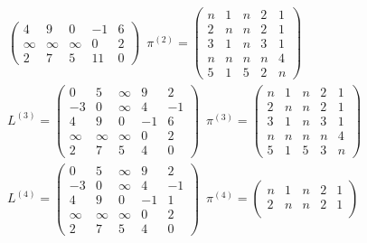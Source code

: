 \documentclass[11pt,a4paper]{article}
\begin{document}
\begin{loesung}
\begin{enumerate}
\begin{align*}
\begin{pmatrix}
                4 & 9 & 0 & -1 & 6 \\
                \infty & \infty & \infty & 0 & 2 \\
                2 & 7 & 5 & 11 & 0
            \end{pmatrix}\,\,\,
            \pi^{(2)} = \begin{pmatrix}
                n & 1 & n & 2 & 1 \\
                2 & n & n & 2 & 1 \\
                3 & 1 & n & 3 & 1 \\
                n & n & n & n & 4 \\
                5 & 1 & 5 & 2 & n
            \end{pmatrix} \\
            L^{(3)} = \begin{pmatrix}
                0 & 5 & \infty & 9 & 2 \\
                -3 & 0 & \infty & 4 & -1 \\
                4 & 9 & 0 & -1 & 6 \\
                \infty & \infty & \infty & 0 & 2 \\
                2 & 7 & 5 & 4 & 0
            \end{pmatrix}\,\,\,
            \pi^{(3)} = \begin{pmatrix}
                n & 1 & n & 2 & 1 \\
                2 & n & n & 2 & 1 \\
                3 & 1 & n & 3 & 1 \\
                n & n & n & n & 4 \\
                5 & 1 & 5 & 3 & n
            \end{pmatrix} \\
            L^{(4)} = \begin{pmatrix}
                0 & 5 & \infty & 9 & 2 \\
                -3 & 0 & \infty & 4 & -1 \\
                4 & 9 & 0 & -1 & 1 \\
                \infty & \infty & \infty & 0 & 2 \\
                2 & 7 & 5 & 4 & 0
            \end{pmatrix}\,\,\,
            \pi^{(4)} = \begin{pmatrix}
                n & 1 & n & 2 & 1 \\
                2 & n & n & 2 & 1 \\

\end{pmatrix}
\end{align*}
\end{enumerate}
\end{loesung}
\end{document}

